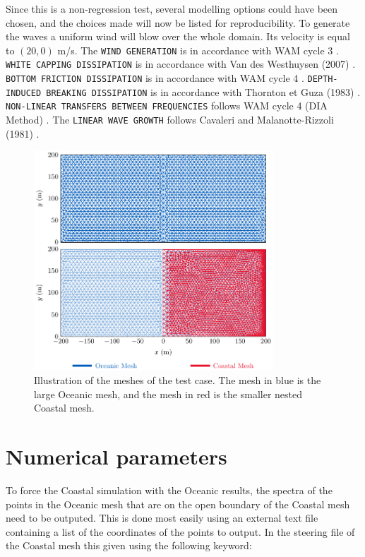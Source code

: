 Since this is a non-regression test, several modelling options could have been chosen, and the choices made will now be listed for reproducibility. To generate the waves a uniform wind will blow over the whole domain. Its velocity is equal to $(20,0)$ m/s. The \texttt{WIND GENERATION} is in accordance with WAM cycle 3 \citep{Snyder1981}. \texttt{WHITE CAPPING DISSIPATION} is in accordance with Van des Westhuysen (2007) \citep{Westhuys2007}. \texttt{BOTTOM FRICTION DISSIPATION} is in accordance with WAM cycle 4 \citep{Hasselmann1973,Bouws1983}. \texttt{DEPTH-INDUCED BREAKING DISSIPATION} is in accordance with Thornton et Guza  (1983) \citep{Thornton1983}. \texttt{NON-LINEAR TRANSFERS BETWEEN FREQUENCIES} follows WAM cycle 4 (DIA Method) \citep{Hasselmann1985_1}. The \texttt{LINEAR WAVE GROWTH} follows Cavaleri and Malanotte-Rizzoli (1981) \citep{Cavaleri1981,Tolman1992}.

\begin{figure}[H]
\begin{center}
	\includegraphics[width=0.8\textwidth]{./Figures/MeshIllustration.pdf}
\end{center}
\caption{Illustration of the meshes of the test case. The mesh in {\color{EdfBlue} blue} is the large
Oceanic mesh, and the mesh in {\color{PantoneRed} red} is the smaller nested Coastal mesh.}
\label{fig:impose_spectra_meshes}
\end{figure}
%

%
%
\section{Numerical parameters}
%
To force the Coastal simulation with the Oceanic results, the spectra of the points in the Oceanic
mesh that are on the open boundary of the Coastal mesh need to be outputed. This is done most easily
using an external text file containing a list of the coordinates of the points to output. In the
steering file of the Coastal mesh this given using the following keyword:

